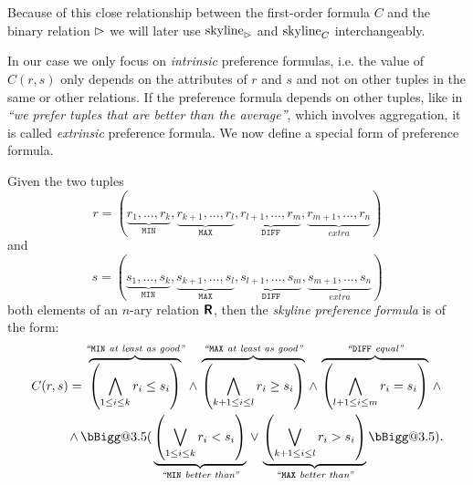 Because of this close relationship between the first-order formula $C$ and
the binary relation $\vartriangleright$ we will later use
$\skyline_\dominates$ and $\skyline_C$ interchangeably.

In our case we only focus on \emph{intrinsic} preference formulas, i.e.
the value of $C(r,s)$ only depends on the attributes of $r$ and $s$ and
not on other tuples in the same or other relations.  If the preference
formula depends on other tuples, like in \emph{``we prefer tuples
that are better than the average''}, which involves aggregation, it
is called \emph{extrinsic} preference formula. 
%
We now define a special form of preference formula.


\makeatletter
\def\Bigggl{\mathopen\bBigg@{3.5}}
\def\Bigggr{\mathclose\bBigg@{3.5}}
\makeatother



\begin{definition}
\label{def:skyline-pf}
Given the two tuples 
%
\emph{\[
r = (\underbrace{r_1, \ldots, r_k}_\texttt{MIN}, \underbrace{r_{k+1}, \ldots, r_l}_\texttt{MAX}, \underbrace{r_{l+1}, \ldots, r_m}_\texttt{DIFF}, \underbrace{r_{m+1}, \ldots, r_n}_\textit{extra})
\]}
%
and
%
\emph{\[
s = (\underbrace{s_1, \ldots, s_k}_\texttt{MIN}, \underbrace{s_{k+1}, \ldots, s_l}_\texttt{MAX}, \underbrace{s_{l+1}, \ldots, s_m}_\texttt{DIFF}, \underbrace{s_{m+1}, \ldots, s_n}_\textit{extra})
\]}
%
both elements of an $n$-ary relation $\textnormal{\bf\textsf{R}}$, then the \emph{skyline preference formula} is of the form:
%
\emph{
\begin{eqnarray}\label{equ:skylinepf}
C(r,s) = \overbrace{\left( \bigland_{1 \le i \le k} r_i \le s_i \right)}^{\textit{``\/}\texttt{MIN}\textit{ at least as good''}} \,\land\,
\overbrace{\left( \bigland_{k+1 \le i \le l} r_i \ge s_i \right)}^{\textit{``\/}\texttt{MAX}\textit{ at least as good''}} \,\land\,
\overbrace{\left( \bigland_{l+1 \le i \le m} r_i = s_i \right)}^{\textit{``\/}\texttt{DIFF}\textit{ equal''}} \,\land\, \nonumber\\
\,\land\,
\Bigggl(\,\underbrace{\left( \biglor_{1 \le i \le k} r_i < s_i \right)}_{\textit{``\/}\texttt{MIN}\textit{ better than''}} \,\lor\,
       \underbrace{\left( \biglor_{k+1 \le i \le l} r_i > s_i \right)}_{\textit{``\/}\texttt{MAX}\textit{ better than''}}\,\Bigggr).
\end{eqnarray}
}
\end{definition}

